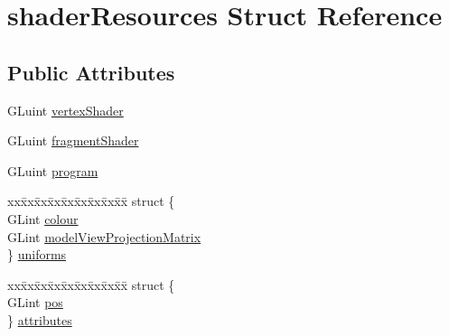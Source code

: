 \hypertarget{structshader_resources}{
\section{shader\-Resources \-Struct \-Reference}
\label{structshader_resources}
}
\subsection*{\-Public \-Attributes}
\begin{DoxyCompactItemize}
\item 
\-G\-Luint \hyperlink{structshader_resources_abe191bcd7c0511350d50df60d4105650}{vertex\-Shader}
\item 
\-G\-Luint \hyperlink{structshader_resources_a7f7c50ec931e8313fa125a12aec1de52}{fragment\-Shader}
\item 
\-G\-Luint \hyperlink{structshader_resources_aeb0b002a54cffa47fa0ab63402d9e877}{program}
\item 
\begin{tabbing}
xx\=xx\=xx\=xx\=xx\=xx\=xx\=xx\=xx\=\kill
struct \{\\
\>GLint \hyperlink{structshader_resources_ade284e9d31dbb5d8ae20d48ca71d4803}{colour}\\
\>GLint \hyperlink{structshader_resources_a25bf9d04069cd045b8fcd4483b25ccf5}{modelViewProjectionMatrix}\\
\} \hyperlink{structshader_resources_afa2fe5d923b03ebc556d7e139ce3d559}{uniforms}\\

\end{tabbing}\item 
\begin{tabbing}
xx\=xx\=xx\=xx\=xx\=xx\=xx\=xx\=xx\=\kill
struct \{\\
\>GLint \hyperlink{structshader_resources_a074cd8e5271a817d584c38e21a474ce2}{pos}\\
\} \hyperlink{structshader_resources_a00004b6567d1e7178a15842dd8325e42}{attributes}\\

\end{tabbing}\end{DoxyCompactItemize}


